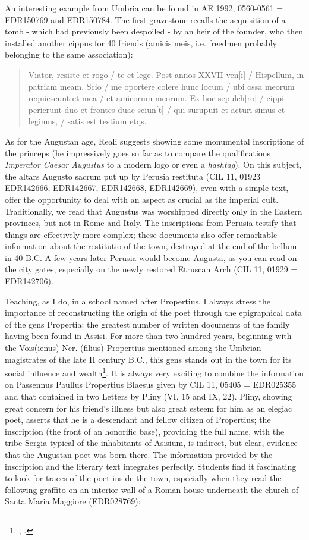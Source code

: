 \documentclass[amsthm,ebook]{saparticle}
\begin{document}
An interesting example from Umbria can be found in AE 1992, 0560-0561 = EDR150769 and EDR150784. The first gravestone
recalls the acquisition of a tomb - which had previously been despoiled - by an heir of the founder, who then installed
another cippus for 40 friends (amicis meis, i.e. freedmen probably belonging to the same association):
\begin{quotation}

Viator, resiste et rogo / te et lege. Post annos XXVII ven[i] / Hispellum, in patriam meam. Scio / me oportere colere
hunc locum / ubi ossa meorum requiescunt et mea / et amicorum meorum. Ex hoc sepulch[ro] / cippi perierunt duo et
frontes duae sciun[t] / qui surupuit et acturi simus et legimus, / satis est testium etqs.

\end{quotation}
As for the Augustan age, Reali suggests showing some monumental inscriptions of the princeps (he impressively goes so
far as to compare the qualifications \emph{Imperator Caesar Augustus} to a modern logo or even a \emph{hashtag}). On
this subject, the altars Augusto sacrum put up by Perusia restituta (CIL 11, 01923 = EDR142666, EDR142667, EDR142668,
EDR142669), even with a simple text, offer the opportunity to deal with an aspect as crucial as the imperial cult.
Traditionally, we read that Augustus was worshipped directly only in the Eastern provinces, but not in Rome and Italy.
The inscriptions from Perusia testify that things are effectively more complex; these documents also offer remarkable
information about the restitutio of the town, destroyed at the end of the bellum in 40 B.C. A few years later Perusia
would become Augusta, as you can read on the city gates, especially on the newly restored Etruscan Arch (CIL 11, 01929
= EDR142706).

Teaching, as I do, in a school named after Propertius, I always stress the importance of reconstructing the origin of
the poet through the epigraphical data of the gens Propertia: the greatest number of written documents of the family
having been found in Assisi. For more than two hundred years, beginning with the Vois(ienus) Ner. (filius) Propertius
mentioned among the Umbrian magistrates of the late II century B.C., this gens stands out in the town for its social
influence and wealth\footnote{\citet{Forni1986}; \citet{Zuddas2006}.}. It is always very exciting to combine the information on
Passennus Paullus Propertius Blaesus given by CIL 11, 05405 = EDR025355 and that contained in two Letters by Pliny (VI,
15 and IX, 22). Pliny, showing great concern for his friend’s illness but also great esteem for him as an elegiac poet,
asserts that he is a descendant and fellow citizen of Propertius; the inscription (the front of an honorific base),
providing the full name, with the tribe Sergia typical of the inhabitants of Asisium, is indirect, but clear, evidence
that the Augustan poet was born there. The information provided by the inscription and the literary text integrates
perfectly. Students find it fascinating to look for traces of the poet inside the town, especially when they read the
following graffito on an interior wall of a Roman house underneath the church of Santa Maria Maggiore (EDR028769):
\end{document}
